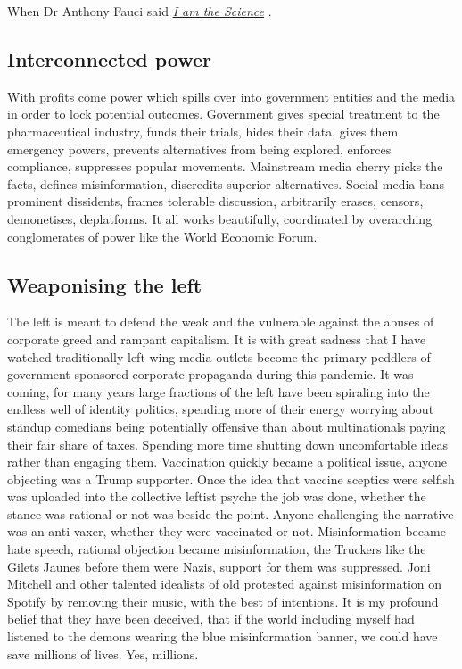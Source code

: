 \documentclass[11pt,a4paper,notitlepage]{report}
\begin{document}
When Dr Anthony Fauci said \href{https://www.nationalreview.com/2021/11/anthony-fauci-i-am-the-science/}{\textit{I am the Science}} \cite{nationalreview29112021}.

\subsection*{Interconnected power}

With profits come power which spills over into government entities and the media in order to lock potential outcomes. Government gives special treatment to the pharmaceutical industry, funds their trials, hides their data, gives them emergency powers, prevents alternatives from being explored, enforces compliance, suppresses popular movements. Mainstream media cherry picks the facts, defines misinformation, discredits superior alternatives. Social media bans prominent dissidents, frames tolerable discussion, arbitrarily erases, censors, demonetises, deplatforms. It all works beautifully, coordinated by overarching conglomerates of power like the World Economic Forum.

\subsection*{Weaponising the left}

The left is meant to defend the weak and the vulnerable against the abuses of corporate greed and rampant capitalism. It is with great sadness that I have watched traditionally left wing media outlets become the primary peddlers of government sponsored corporate propaganda during this pandemic. It was coming, for many years large fractions of the left have been spiraling into the endless well of identity politics, spending more of their energy worrying about standup comedians being potentially offensive than about multinationals paying their fair share of taxes. Spending more time shutting down uncomfortable ideas rather than engaging them. Vaccination quickly became a political issue, anyone objecting was a Trump supporter. Once the idea that vaccine sceptics were selfish was uploaded into the collective leftist psyche the job was done, whether the stance was rational or not was beside the point. Anyone challenging the narrative was an anti-vaxer, whether they were vaccinated or not. Misinformation became hate speech, rational objection became misinformation, the Truckers like the Gilets Jaunes before them were Nazis, support for them was suppressed. Joni Mitchell and other talented idealists of old protested against misinformation on Spotify by removing their music, with the best of intentions. It is my profound belief that they have been deceived, that if the world including myself had listened to the demons wearing the blue misinformation banner, we could have save millions of lives. Yes, millions.
\end{document}
